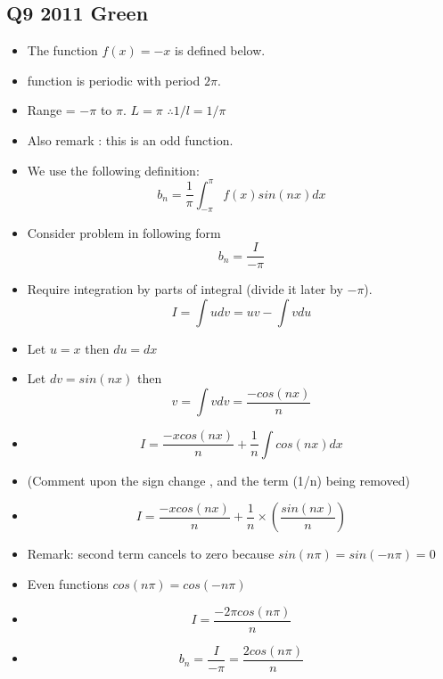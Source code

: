 \documentclass[11pt,a4paper,titlepage,oneside,openany]{article}
\numberwithin{equation}{section}
\numberwithin{algorithm}{section}
\numberwithin{figure}{section}
\numberwithin{table}{section}
\begin{document}
\subsection*{Q9 2011 Green}
\begin{itemize}
\item The function $f(x) = -x$  is defined below.

\item function is periodic with period $2\pi$.
\item Range = $-\pi$ to $\pi$. $L=\pi$ $\therefore 1/l = 1/\pi$ 
\item Also remark : this is an odd function.
\item We use the following definition: \[ b_n = \frac{1}{\pi}\int^{\pi}_{-\pi} f(x) sin(nx) dx \]
\item Consider problem in following form
\[b_n = \frac{I}{-\pi}\]
\item Require integration by parts of integral (divide it later by $-\pi$).
\[ I =\int u dv = uv - \int vdu \]
\item Let $u = x$ then $du = dx$
\item Let $dv = sin(nx)$ then 
\[ v = \int v dv = \frac{-cos(nx)}{n}  \] 
\item \[ I = \frac{-xcos(nx)}{n} + \frac{1}{n} \int cos(nx) dx \]
\item (Comment upon the sign change , and the term (1/n) being removed)
\item \[ I = \frac{-xcos(nx)}{n} + \frac{1}{n} \times \left(\frac{sin(nx)}{n}\right) \]
\item Remark: second term cancels to zero because $sin(n\pi) = sin(-n\pi) = 0 $
\item Even functions $cos(n\pi) = cos(-n\pi) $
\item \[ I =  \frac{-2\pi cos(n \pi)}{n} \]
\item \[b_n = \frac{I}{-\pi} =  \frac{2 cos(n \pi)}{n}\]
\end{itemize}


\newpage
\end{document}
